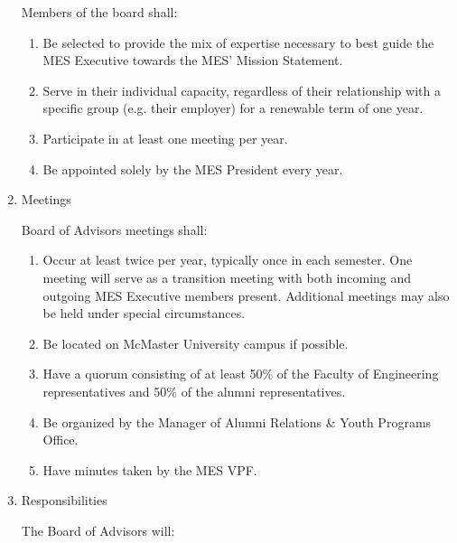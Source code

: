 \begin{enumerate}
  Members of the board shall:

  \begin{enumerate}
   \item
    Be selected to provide the mix of expertise necessary to best guide the MES Executive towards the MES' Mission Statement.
   \item
    Serve in their individual capacity, regardless of their relationship with a specific group (e.g. their employer) for a renewable term of one year.
   \item
    Participate in at least one meeting per year.
   \item
    Be appointed solely by the MES President every year.
  \end{enumerate}

 \item
  Meetings

  Board of Advisors meetings shall:

  \begin{enumerate}
   \item
    Occur at least twice per year, typically once in each semester. One meeting will serve as a transition meeting with both incoming and outgoing MES Executive members present. Additional meetings may also be held under special circumstances.
   \item
    Be located on McMaster University campus if possible.
   \item
    Have a quorum consisting of at least 50\% of the Faculty of Engineering representatives and 50\% of the alumni representatives.
   \item
    Be organized by the Manager of Alumni Relations \& Youth Programs Office.
   \item
    Have minutes taken by the MES VPF.
  \end{enumerate}

 \item
  Responsibilities

  The Board of Advisors will:


\end{enumerate}
